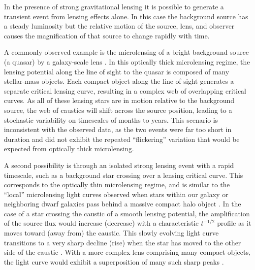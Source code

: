 In the presence of strong gravitational lensing it is possible to
generate a transient event from lensing effects alone.  In this case
the background source has a steady luminosity but the relative motion
of the source, lens, and observer causes the magnification of that
source to change rapidly with time.

A commonly observed example is the microlensing of a bright background
source (a quasar) by a galaxy-scale lens \citep{Wambsganss:2001,
  Kochanek:2004}.  In this optically thick microlensing regime, the
lensing potential along the line of sight to the quasar is composed of
many stellar-mass objects.  Each compact object along the line of
sight generates a separate critical lensing curve, resulting in a
complex web of overlapping critical curves. As all of these lensing
stars are in motion relative to the background source, the web of
caustics will shift across the source position, leading to a
stochastic variability on timescales of months to years.  This
scenario is inconsistent with the observed data, as the two \spock
events were far too short in duration and did not exhibit the repeated
``flickering'' variation that would be expected from optically thick
microlensing.

A second possibility is through an isolated strong lensing event with
a rapid timescale, such as a background star crossing over a lensing
critical curve.  This corresponds to the optically thin microlensing
regime, and is similar to the ``local'' microlensing light curves
observed when stars within our galaxy or neighboring dwarf galaxies
pass behind a massive compact halo object \citep{Paczynski:1986,
  Alcock:1993, Aubourg:1993, Udalski:1993}.  In the case of a star
crossing the caustic of a smooth lensing potential, the amplification
of the source flux would increase (decrease) with a characteristic
$t^{-1/2}$ profile as it moves toward (away from) the caustic. This
slowly evolving light curve transitions to a very sharp decline (rise)
when the star has moved to the other side of the caustic
\citep{Schneider:1986, MiraldaEscude:1991}.  With a more complex lens
comprising many compact objects, the light curve would exhibit a
superposition of many such sharp peaks \citep{Lewis:1993}.

